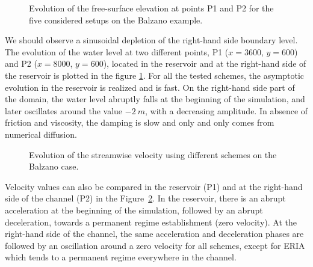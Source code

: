 \begin{figure}[H]
\begin{minipage}[t]{0.5\textwidth}
 \centering
\end{minipage}%
\begin{minipage}[t]{0.5\textwidth}
 \centering
\end{minipage}
\caption{Evolution of the free-surface elevation at points P1 and P2 for the five considered setups on the Balzano example.}
\label{fig:balzano:temporalSL}
\end{figure}

We should observe a sinusoidal depletion of the right-hand side boundary level.
The evolution of the water level at two different points, P1 ($x=3600$, $y=600$) and P2 ($x=8000$, $y=600$), located in the reservoir and at the right-hand side of the reservoir is plotted in the figure \ref{fig:balzano:temporalSL}.
For all the tested schemes, the asymptotic evolution in the reservoir is realized and is fast.
On the right-hand side part of the domain, the water level abruptly falls at the beginning of
the simulation, and later oscillates around the value $-2~m$,
with a decreasing amplitude. In absence of friction and viscosity, the damping is slow and only 
and only comes from numerical diffusion.

\begin{figure}[H]
\begin{minipage}[t]{0.5\textwidth}
 \centering
\end{minipage}%
\begin{minipage}[t]{0.5\textwidth}
 \centering
\end{minipage}
\caption{Evolution of the streamwise velocity using different schemes on the Balzano case.}
\label{fig:balzano:temporalU}
\end{figure}

Velocity values can also be compared in the reservoir (P1) and at the right-hand side of the channel (P2) in the Figure~\ref{fig:balzano:temporalU}.
In the reservoir, there is an abrupt acceleration at the beginning of the simulation, followed by an
abrupt deceleration, towards a permanent regime establishment (zero velocity).
At the right-hand side of the channel, the same acceleration and deceleration
phases are followed by an oscillation around a zero velocity for all schemes,
except for ERIA which tends to a permanent regime everywhere in the channel.

